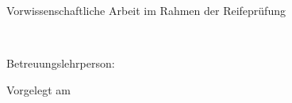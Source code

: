 \begin{titlepage}

    \begin{center}
        \vspace*{1cm}

        \large{Vorwissenschaftliche Arbeit im Rahmen der Reifeprüfung}

        \vspace*{8cm}
        \huge{\textbf{\VWAtitel}}

        \LARGE{\textbf{\VWAauthor}}

        \large{\klasse\ \jahr}

        \vfill

        \schulinfo

        \vspace*{0.5cm}

        Betreuungslehrperson: \betreuungslehrperson

        \vspace*{0.5cm}
        Vorgelegt am \vorlagedatum

    \end{center}
\end{titlepage}
\restoregeometry

